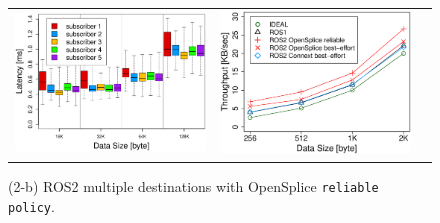 \documentclass{sig-alternate-05-2015}
\begin{document}
\begin{figure}[t]
  \textcolor{red}{
  \begin{tabular}{ccc}
    \begin{minipage}[t]{0.32\textwidth}
      \includegraphics[width=1.0\linewidth]{../figure/BoxPlot_ospl_128K_multi-pub5.eps}
      \vspace{-7mm}
      \caption{(2-b) ROS2 multiple destinations with OpenSplice \texttt{reliable policy}.}
      \label{fig:ospl_multi_128K}
    \end{minipage}
    &
    \begin{minipage}[t]{0.32\textwidth}
      \includegraphics[width=1.0\linewidth]{../figure/throughput_remote_small-data.eps}
      \vspace{-7mm}

\end{minipage}
\end{tabular}}
\end{figure}
\end{document}
